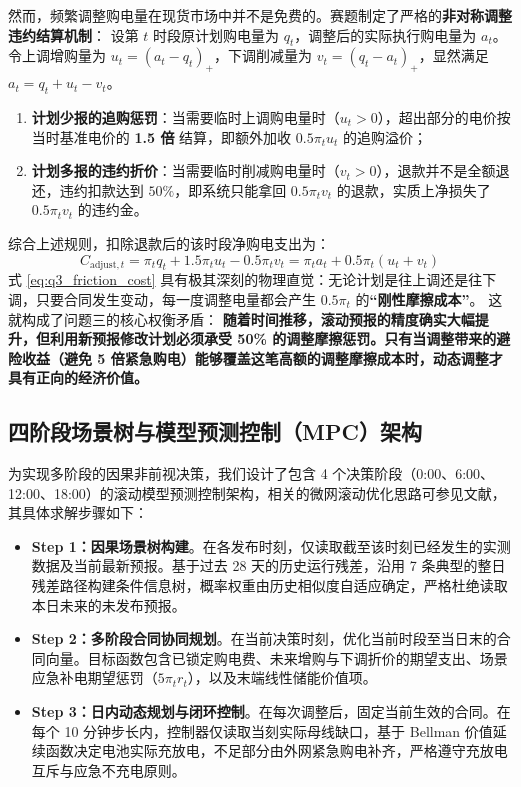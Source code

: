 \documentclass[withoutpreface]{cumcmthesis}
\begin{document}
然而，频繁调整购电量在现货市场中并不是免费的。赛题制定了严格的\textbf{非对称调整违约结算机制}：
设第 $t$ 时段原计划购电量为 $q_t$，调整后的实际执行购电量为 $a_t$。令上调增购量为 $u_t = (a_t - q_t)_+$，下调削减量为 $v_t = (q_t - a_t)_+$，显然满足 $a_t = q_t + u_t - v_t$。
\begin{enumerate}
    \item \textbf{计划少报的追购惩罚}：当需要临时上调购电量时（$u_t > 0$），超出部分的电价按当时基准电价的 \textbf{1.5 倍} 结算，即额外加收 $0.5\pi_t u_t$ 的追购溢价；
    \item \textbf{计划多报的违约折价}：当需要临时削减购电量时（$v_t > 0$），退款并不是全额退还，违约扣款达到 $50\%$，即系统只能拿回 $0.5\pi_t v_t$ 的退款，实质上净损失了 $0.5\pi_t v_t$ 的违约金。
\end{enumerate}
综合上述规则，扣除退款后的该时段净购电支出为：
\begin{equation}
    C_{\text{adjust}, t} = \pi_t q_t + 1.5\pi_t u_t - 0.5\pi_t v_t = \pi_t a_t + 0.5\pi_t (u_t + v_t) \label{eq:q3_friction_cost}
\end{equation}
式 \eqref{eq:q3_friction_cost} 具有极其深刻的物理直觉：无论计划是往上调还是往下调，只要合同发生变动，每一度调整电量都会产生 $0.5\pi_t$ 的\textbf{“刚性摩擦成本”}。
这就构成了问题三的核心权衡矛盾：
\textbf{随着时间推移，滚动预报的精度确实大幅提升，但利用新预报修改计划必须承受 50\% 的调整摩擦惩罚。只有当调整带来的避险收益（避免 5 倍紧急购电）能够覆盖这笔高额的调整摩擦成本时，动态调整才具有正向的经济价值。}

\subsection{四阶段场景树与模型预测控制（MPC）架构}
为实现多阶段的因果非前视决策，我们设计了包含 4 个决策阶段（0:00、6:00、12:00、18:00）的滚动模型预测控制架构，相关的微网滚动优化思路可参见文献\cite{bib:pacaud}，其具体求解步骤如下：

\begin{itemize}
    \item \textbf{Step 1：因果场景树构建}。在各发布时刻，仅读取截至该时刻已经发生的实测数据及当前最新预报。基于过去 28 天的历史运行残差，沿用 7 条典型的整日残差路径构建条件信息树，概率权重由历史相似度自适应确定，严格杜绝读取本日未来的未发布预报。
    \item \textbf{Step 2：多阶段合同协同规划}。在当前决策时刻，优化当前时段至当日末的合同向量。目标函数包含已锁定购电费、未来增购与下调折价的期望支出、场景应急补电期望惩罚（$5\pi_t r_t$），以及末端线性储能价值项。
    \item \textbf{Step 3：日内动态规划与闭环控制}。在每次调整后，固定当前生效的合同。在每个 10 分钟步长内，控制器仅读取当刻实际母线缺口，基于 Bellman 价值延续函数决定电池实际充放电，不足部分由外网紧急购电补齐，严格遵守充放电互斥与应急不充电原则。
\end{itemize}
\end{document}
